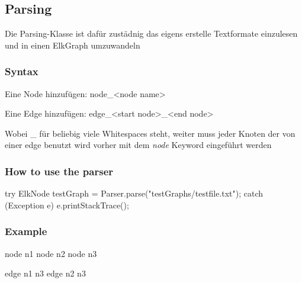 


\subsection*{Parsing}
Die Parsing-Klasse ist dafür zustädnig das eigens erstelle Textformate einzulesen
und in einen ElkGraph umzuwandeln

\subsubsection*{Syntax}
Eine Node hinzufügen:
  node_<node name>
  
Eine Edge hinzufügen:
  edge_<start node>_<end node>
 
Wobei _ für beliebig viele Whitespaces steht,
weiter muss jeder Knoten der von einer edge benutzt wird vorher mit dem \textit{node} Keyword eingeführt werden

\subsubsection*{How to use the parser}
try 
{ 
  ElkNode testGraph = Parser.parse("testGraphs/testfile.txt");
} 
catch (Exception e)
{
  e.printStackTrace();        
}


\subsubsection*{Example}
node n1
node n2
node n3


edge n1 n3
edge n2 n3 












